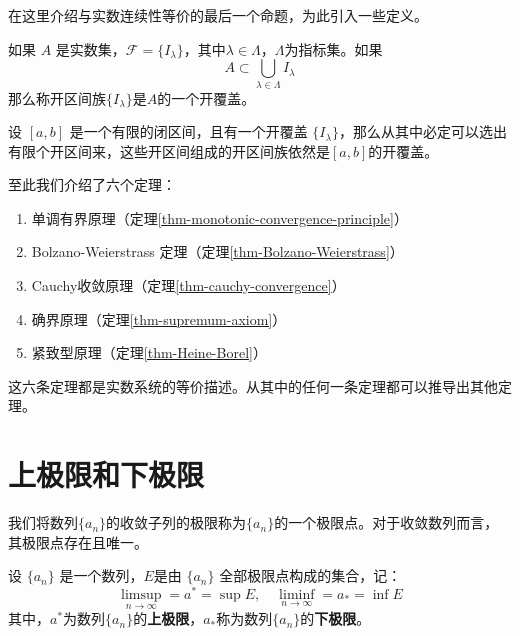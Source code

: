 在这里介绍与实数连续性等价的最后一个命题，为此引入一些定义。

\begin{definition}[开覆盖]
	如果 $A$ 是实数集，$\mathcal F = \{I_\lambda\}$，其中$\lambda \in \Lambda$，$\Lambda$为指标集。如果
	$$
		A\subset \bigcup_{\lambda \in \Lambda} I_\lambda
	$$
	那么称开区间族$\{I_\lambda\}$是$A$的一个开覆盖。
\end{definition}


\begin{theorem}[紧致性定理]\label{thm-Heine-Borel}
	设 $[a,b]$ 是一个有限的闭区间，且有一个开覆盖 $\{I_\lambda\}$，那么从其中必定可以选出有限个开区间来，这些开区间组成的开区间族依然是$[a,b]$的开覆盖。
\end{theorem}


至此我们介绍了六个定理：

\begin{enumerate}
	\item 单调有界原理（定理\ref{thm-monotonic-convergence-principle}）
	\item Bolzano-Weierstrass 定理（定理\ref{thm-Bolzano-Weierstrass}）
	\item Cauchy收敛原理（定理\ref{thm-cauchy-convergence}）
	\item 确界原理（定理\ref{thm-supremum-axiom}）
	\item 紧致型原理（定理\ref{thm-Heine-Borel}）
\end{enumerate}

这六条定理都是实数系统的等价描述。从其中的任何一条定理都可以推导出其他定理。


\section{上极限和下极限}

我们将数列$\{a_n\}$的收敛子列的极限称为$\{a_n\}$的一个极限点。对于收敛数列而言，其极限点存在且唯一。

\begin{definition}\label{def-uplim}
	设 $\{a_n\}$ 是一个数列，$E$是由 $\{a_n\}$ 全部极限点构成的集合，记：
	$$
	\limsup_{n\rightarrow \infty}=a^*=\sup E,\quad \liminf_{n\rightarrow \infty}=a_*=\inf E
	$$
	其中，$a^*$为数列$\{a_n\}$的\textbf{上极限}，$a_*$称为数列$\{a_n\}$的\textbf{下极限}。
\end{definition}

